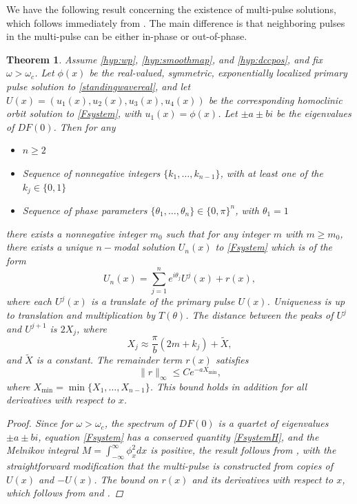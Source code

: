 \documentclass[12pt]{article}
\newtheorem{theorem}{Theorem}
\begin{document}
We have the following result concerning the existence of multi-pulse solutions, which follows immediately from \cite[Theorem~3.6]{SandstedeStrut}. The main difference is that neighboring pulses in the multi-pulse can be either in-phase or out-of-phase. 

\begin{theorem}\label{theorem:multiexist}
Assume \cref{hyp:wp}, \cref{hyp:smoothmap}, and \cref{hyp:dccpos}, and fix $\omega > \omega_c$. Let $\phi(x)$ be the real-valued, symmetric, exponentially localized primary pulse solution to \cref{standingwavereal}, and let $U(x) = (u_1(x), u_2(x), u_3(x), u_4(x))$ be the corresponding homoclinic orbit solution to \cref{Fsystem}, with $u_1(x) = \phi(x)$. Let $\pm a \pm bi$ be the eigenvalues of $DF(0)$. Then for any 
\begin{itemize}
\item $n \geq 2$
\item Sequence of nonnegative integers $\{ k_1, \dots, k_{n-1} \}$, with at least one of the $k_j \in \{0, 1 \}$
\item Sequence of phase parameters $\{ \theta_1, \dots, \theta_n \} \in \{0, \pi \}^n$, with $\theta_1 = 1$
\end{itemize}
there exists a nonnegative integer $m_0$ such that for any integer $m$ with $m \geq m_0$, there exists a unique $n-$modal solution $U_n(x)$ to \cref{Fsystem} which is of the form
  \begin{equation}\label{qn}
  U_n(x) = \sum_{j = 1}^{n} e^{i \theta_j } U^j(x) + r(x),
  \end{equation}
  where each $U^j(x)$ is a translate of the primary pulse $U(x)$. Uniqueness is up to translation and multiplication by $T(\theta)$. The distance between the peaks of $U^j$ and $U^{j+1}$ is $2 X_j$, where
  \begin{equation}\label{pulsedistances}
  X_j \approx \frac{\pi}{b}(2 m + k_j) + \tilde{X},
  \end{equation}
  and $\tilde{X}$ is a constant. The remainder term $r(x)$ satisfies
  \begin{equation}\label{rbound}
  \|r\|_\infty \leq C e^{-a X_{\mathrm{min}}},
  \end{equation}
  where $X_{\mathrm{min}} = \min\{X_1, \dots, X_{n-1}\}$. This bound holds in addition for all derivatives with respect to $x$.
\begin{proof}
Since for $\omega > \omega_c$, the spectrum of $DF(0)$ is a quartet of eigenvalues $\pm a \pm b i$, equation \cref{Fsystem} has a conserved quantity \cref{FsystemH}, and the Melnikov integral $M = \int_{-\infty}^\infty \phi_x^2 dx$ is positive, the result follows from \cite[Theorem~3.6]{SandstedeStrut}, with the straightforward modification that the multi-pulse is constructed from copies of $U(x)$ and $-U(x)$. The bound on $r(x)$ and its derivatives with respect to $x$, which follows from \cite{Sandstede1993} and \cite{Sandstede1998}.
\end{proof}
\end{theorem}
\end{document}
